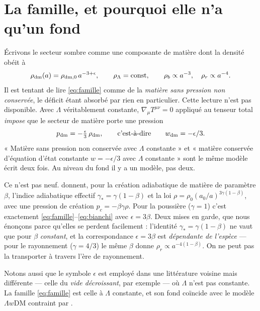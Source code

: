\documentclass[11pt,a4paper]{article}
\begin{document}
\section{La famille, et pourquoi elle n'a qu'un fond}
\label{sec:famille}

Écrivons le secteur sombre comme une composante de matière dont la densité obéit à
\begin{equation}
\rho_{\rm dm}(a) = \rho_{{\rm dm},0}\,a^{-3+\epsilon},
\qquad
\rho_\Lambda = \text{const},
\qquad
\rho_b \propto a^{-3},\quad \rho_r\propto a^{-4}.
\label{eq:famille}
\end{equation}
Il est tentant de lire \eqref{eq:famille} comme de la \emph{matière sans pression non
conservée}, le déficit étant absorbé par rien en particulier. Cette lecture n'est pas
disponible. Avec $\Lambda$ véritablement constante, $\nabla_\mu T^{\mu\nu}=0$ appliqué au
tenseur total \emph{impose} que le secteur de matière porte une pression
\begin{equation}
p_{\rm dm} = -\tfrac{\epsilon}{3}\,\rho_{\rm dm},
\qquad\text{c'est-à-dire}\qquad
w_{\rm dm} = -\epsilon/3 .
\label{eq:bianchi}
\end{equation}
« Matière sans pression non conservée avec $\Lambda$ constante » et « matière conservée
d'équation d'état constante $w=-\epsilon/3$ avec $\Lambda$ constante » sont le même modèle
écrit deux fois. Au niveau du fond il y a un modèle, pas deux.

Ce n'est pas neuf. \citet{lima1996} donnent, pour la création adiabatique de matière de
paramètre $\beta$, l'indice adiabatique effectif $\gamma_\ast=\gamma(1-\beta)$ et la loi
$\rho=\rho_0(a_0/a)^{3\gamma(1-\beta)}$, avec une pression de création $p_c=-\beta\gamma\rho$.
Pour la poussière ($\gamma=1$) c'est exactement
\eqref{eq:famille}--\eqref{eq:bianchi} avec $\epsilon=3\beta$. Deux mises en garde, que nous
énonçons parce qu'elles se perdent facilement : l'identité $\gamma_\ast=\gamma(1-\beta)$ ne
vaut que pour $\beta$ \emph{constant}, et la correspondance $\epsilon=3\beta$ est
\emph{dépendante de l'espèce} --- pour le rayonnement ($\gamma=4/3$) le même $\beta$ donne
$\rho_r\propto a^{-4(1-\beta)}$. On ne peut pas la transporter à travers l'ère de rayonnement.

Notons aussi que le symbole $\epsilon$ est employé dans une littérature voisine mais
différente --- celle du \emph{vide décroissant}, par exemple \citet{alcaniz2005} --- où
$\Lambda$ n'est pas constante. La famille \eqref{eq:famille} est celle à $\Lambda$ constante,
et son fond coïncide avec le modèle $\Lambda w$DM contraint par \citet{kumar2025}.
\end{document}
